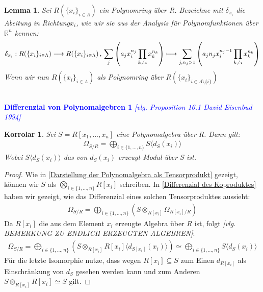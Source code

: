 \documentclass[10pt,a4paper]{report}
\newcommand{\ModulsOfDifferenzials}{David Eisenbud 1994}
\newcounter{Aussage}[chapter]
\newtheorem{korrolar}[Aussage]{Korrolar}
\newtheorem{lemma}[Aussage]{Lemma}
\newcommand{\function}[5]{\nolinebreak{#1:#2 \longrightarrow #3 \, , \, #4 \longmapsto #5}}
\newcommand{\divR}[2]{\Omega_{#1/#2}}
\newcommand{\divf}[1]{d_{#1}}
\newcommand{\Tensor}[3]{#1 \otimes_{#2} #3}
\begin{document}
\begin{lemma}\label{Mehrdimmensionales Algebraisches Differentieren}
Sei $R(\lbrace x_i \rbrace_{i \in \Lambda})$ ein Polynomring über R. Bezeichne mit $\delta_{x_i}$ die Abeitung in Richtung$ x_i$, wie wir sie aus der Analysis für Polynomfunktionen über $\mathbb{R}^n$ kennen:
\begin{gather*}
\function{\delta_{x_i}}{R(\lbrace x_i \rbrace_{i \in \Lambda})}{R(\lbrace x_i \rbrace_{i \in \Lambda})}{\sum_j \left( a_j x_i^{n_j}\prod_{k \neq i} x_k^{n_k}\right)}{\sum_{j,n_j > 1} \left( a_j n_jx_i^{n_j - 1}\prod_{k \neq i} x_k^{n_k}\right)}
\end{gather*}
Wenn wir nun $R(\lbrace x_i \rbrace_{i \in \Lambda})$ als Polynomring über $R(\lbrace x_i \rbrace_{i \in \Lambda \setminus\lbrace i \rbrace})$
\end{lemma}
\ \\
\textcolor{blue}{\textbf{Differenzial von Polynomalgebren 1} \textit{[vlg. Proposition 16.1 \ModulsOfDifferenzials]}}
\begin{korrolar}\label{Differenzial von Polynomalgebren 1}
Sei $S = R[x_1,...,x_n]$ eine Polynomalgebra über R. Dann gilt:
\begin{gather*}
\divR{S}{R} = \bigoplus_{i \in \lbrace 1,...,n \rbrace} S \langle \divf{S}(x_i) \rangle 
\end{gather*}
Wobei $S\langle \divf{S}(x_i)\rangle$ das von $\divf{S}(x_i)$ erzeugt Modul über S ist.
\end{korrolar}
\begin{proof}
Wie in \cref{Darstellung der Polynomalgebra als Tensorprodukt} gezeigt, können wir $S$ als $\bigotimes_{i \in \lbrace 1,...,n \rbrace} R[x_i]$ schreiben. In \cref{Differenzial des Koproduktes} haben wir gezeigt, wie das Differenzial eines solchen Tensorproduktes aussieht:
\begin{gather*}
\divR{S}{R} = \bigoplus_{i \in \lbrace 1,...,n \rbrace} (\Tensor{S}{R[x_i]}{\divR{R[x_i]}{R}})
\end{gather*}
Da $R[x_i]$ die aus dem Element $x_i$ erzeugte Algebra über $R$ ist, folgt \textit{[vlg. BEMERKUNG ZU ENDLICH ERZEUGTEN ALGEBREN]}: 
\begin{gather*}
\divR{S}{R} = \bigoplus_{i \in \lbrace 1,...,n \rbrace} (\Tensor{S}{R[x_i]}{R[x_i]\langle \divf{S[x_i]}(x_i) \rangle})
\simeq \bigoplus_{i \in \lbrace 1,...,n \rbrace} S \langle \divf{S}(x_i) \rangle 
\end{gather*}
Für die letzte Isomorphie nutze, dass wegen $R[x_i] \subseteq S$ zum Einen $\divf{R[x_i]}$ als Einschränkung von $\divf{S}$ gesehen werden kann und zum Anderen $\Tensor{S}{R[x_i]}{R[x_i]} \simeq S$ gilt.
\end{proof}
\end{document}
